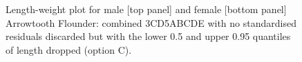 \begin{figure}[htp]
\captionsetup[subfigure]{labelformat=empty}
\begin{center}
\newline
{}
\end{center}
\caption{Length-weight plot for male [top panel] and female [bottom panel] Arrowtooth Flounder: combined 3CD5ABCDE with no standardised residuals discarded but with the lower 0.5 and upper 0.95 quantiles of length dropped (option C).}
\label{fig:lwOptionC}
\end{figure}

